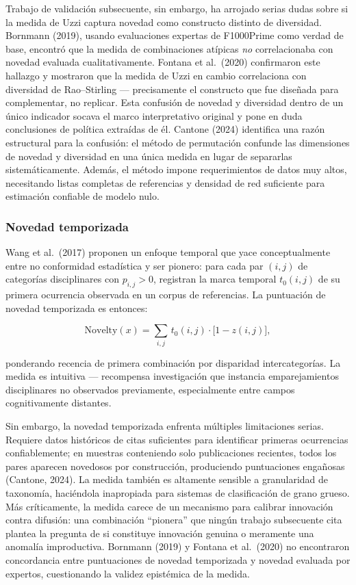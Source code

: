 \documentclass[
]{article}
\begin{document}
Trabajo de validación subsecuente, sin embargo, ha arrojado serias dudas
sobre si la medida de Uzzi captura novedad como constructo distinto de
diversidad. Bornmann (2019), usando evaluaciones expertas de F1000Prime
como verdad de base, encontró que la medida de combinaciones atípicas
\emph{no} correlacionaba con novedad evaluada cualitativamente. Fontana
et al.~(2020) confirmaron este hallazgo y mostraron que la medida de
Uzzi en cambio correlaciona con diversidad de Rao--Stirling ---
precisamente el constructo que fue diseñada para complementar, no
replicar. Esta confusión de novedad y diversidad dentro de un único
indicador socava el marco interpretativo original y pone en duda
conclusiones de política extraídas de él. Cantone (2024) identifica una
razón estructural para la confusión: el método de permutación confunde
las dimensiones de novedad y diversidad en una única medida en lugar de
separarlas sistemáticamente. Además, el método impone requerimientos de
datos muy altos, necesitando listas completas de referencias y densidad
de red suficiente para estimación confiable de modelo nulo.

\hypertarget{novedad-temporizada}{%
\subsubsection{Novedad temporizada}\label{novedad-temporizada}}

Wang et al.~(2017) proponen un enfoque temporal que yace conceptualmente
entre no conformidad estadística y ser pionero: para cada par \((i,j)\)
de categorías disciplinares con \(p_{i,j} > 0\), registran la marca
temporal \(t_0(i,j)\) de su primera ocurrencia observada en un corpus de
referencias. La puntuación de novedad temporizada es entonces:

\[\mathrm{Novelty}(x) = \sum_{i,j}\, t_0(i,j) \cdot \bigl[1 - z(i,j)
\bigr],\]

ponderando recencia de primera combinación por disparidad
intercategorías. La medida es intuitiva --- recompensa investigación que
instancia emparejamientos disciplinares no observados previamente,
especialmente entre campos cognitivamente distantes.

Sin embargo, la novedad temporizada enfrenta múltiples limitaciones
serias. Requiere datos históricos de citas suficientes para identificar
primeras ocurrencias confiablemente; en muestras conteniendo solo
publicaciones recientes, todos los pares aparecen novedosos por
construcción, produciendo puntuaciones engañosas (Cantone, 2024). La
medida también es altamente sensible a granularidad de taxonomía,
haciéndola inapropiada para sistemas de clasificación de grano grueso.
Más críticamente, la medida carece de un mecanismo para calibrar
innovación contra difusión: una combinación ``pionera'' que ningún
trabajo subsecuente cita plantea la pregunta de si constituye innovación
genuina o meramente una anomalía improductiva. Bornmann (2019) y Fontana
et al.~(2020) no encontraron concordancia entre puntuaciones de novedad
temporizada y novedad evaluada por expertos, cuestionando la validez
epistémica de la medida.
\end{document}
